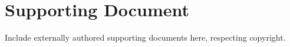\anexos
\chapter{Supporting Document}\label{ann:support}
Include externally authored supporting documents here, respecting copyright.
